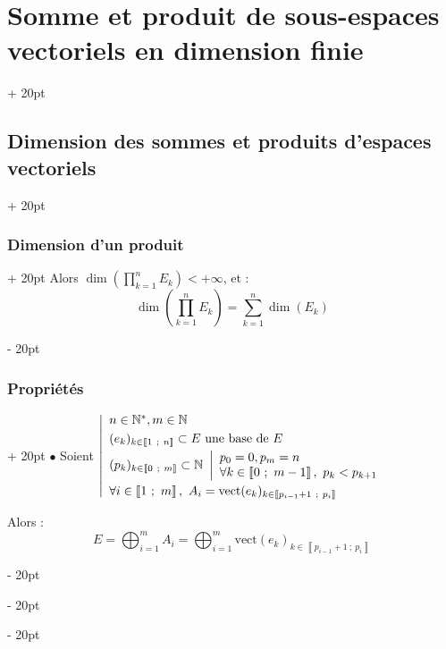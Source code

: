 \documentclass[a4paper, 12pt, twoside]{article}
\newcommand{\N}{\mathbb{N}} %
\newcommand{\nset}[2]{\left\llbracket #1\ ;\ #2 \right\rrbracket}
\newcommand{\lr}[1]{\left( #1 \right)}
\newcommand{\ind}[1][20pt]{\advance\leftskip + #1}
\newcommand{\deind}[1][20pt]{\advance\leftskip - #1}
\newenvironment{indt}[2][20pt]{#2 \par \ind[#1]}{\par \deind} %
\begin{document}
\begin{indt}{\section{Somme et produit de sous-espaces vectoriels en dimension finie}}
\begin{indt}{\subsection{Dimension des sommes et produits d'espaces vectoriels}}
\begin{indt}{\subsubsection{Dimension d'un produit}}
                Alors $\displaystyle \dim\!\lr{\prod_{k = 1}^n E_k} < +\infty$, et :
                    \[ \dim\!\lr{\prod_{k = 1}^n E_k} = \sum_{k = 1}^n \dim(E_k) \]
            \end{indt}
            
            \vspace{12pt}
            
            \begin{indt}{\subsubsection{Propriétés}}
                $\bullet$ Soient
                $
                    \left|
                    \begin{array}{l}
                        n \in \N^*, m \in \N
                        \vspace{3pt}
                        \\
                        (e_k)_{k \in \nset 1 n} \subset E\ \text{une base de $E$}
                        \vspace{3pt}
                        \\
                        (p_k)_{k \in \nset 0 m} \subset \N\
                        \left|
                        \begin{array}{l}
                            p_0 = 0, p_m = n
                            \\
                            \forall k \in \nset{0}{m - 1},\ p_k < p_{k + 1}
                        \end{array}
                        \right.
                        \vspace{3pt}
                        \\
                        \forall i \in \nset 1 m,\ A_i = \mathrm{vect}(e_k)_{k \in \nset{p_{i - 1} + 1}{p_i}}
                    \end{array}
                    \right.
                $
                
                Alors :
                    \[ E = \bigoplus_{i = 1}^m A_i = \bigoplus_{i = 1}^m \mathrm{vect}(e_k)_{k \in \nset{p_{i - 1} + 1}{p_i}} \]
                
                \vspace{12pt}
                

\end{indt}
\end{indt}
\end{indt}
\end{document}
